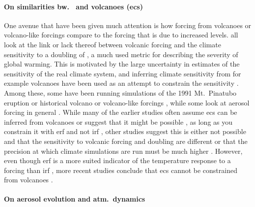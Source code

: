 \documentclass{ametsocV5}
\begin{document}
\paragraph*{On similarities bw.\  and volcanoes (\acrshort{ecs})}

One avenue that have been given much attention is how forcing from volcanoes or
volcano-like forcings compare to the forcing that is due to increased  levels.
\citet{boer2007,marvel2016,merlis2014,ollila2016,richardson2019,salvi2022,wigley2005}
all look at the link or lack thereof between volcanic forcing and the climate
sensitivity to a doubling of , a much used metric for describing the severity of
global warming. This is motivated by the large uncertainty in estimates of the
sensitivity of the real climate system, and inferring climate sensitivity from for
example volcanoes have been used as an attempt to constrain the sensitivity
\citep{boer2007}. Among these, some have been running simulations of the 1991 Mt.\
Pinatubo eruption \citep{merlis2014,ollila2016} or historical volcano or volcano-like
forcings \citep{boer2007,marvel2016,wigley2005}, while some look at aerosol forcing in
general \citep{richardson2019,salvi2022}. While many of the earlier studies often assume
\acrshort{ecs} can be inferred from volcanoes \citep{wigley2005} or suggest that it
might be possible \citep{bender2010}, as long as you constrain it with \acrfull{erf} and
not \acrfull{irf} \citep{richardson2019}, other studies suggest this is either not
possible and that the sensitivity to volcanic forcing and \ce{CO2} doubling are
different or that the precision at which climate simulations are run must be much higher
\citep{douglass2006,boer2007,salvi2022}. However, even though \acrshort{erf} is a more
suited indicator of the temperature response to a forcing than \acrshort{irf}
\citep{marvel2016,richardson2019}, more recent studies conclude that \acrshort{ecs}
cannot be constrained from volcanoes \citep{pauling2023}.

\paragraph*{On aerosol evolution and atm.\ dynamics}
\end{document}
